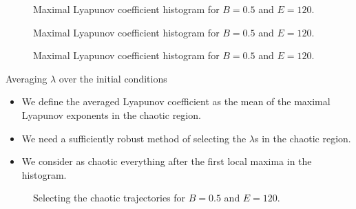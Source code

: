 \documentclass{beamer}
\begin{document}
\begin{frame}
	\begin{figure}
		
		\caption{Maximal Lyapunov coefficient histogram for \(B=0.5\)
		and \(E=120\).}
	\end{figure}
\end{frame}


\begin{frame}
	\begin{figure}
		
		\caption{Maximal Lyapunov coefficient histogram for \(B=0.5\)
		and \(E=120\).}
	\end{figure}
\end{frame}


\begin{frame}
	\begin{figure}
		
		\caption{Maximal Lyapunov coefficient histogram for \(B=0.5\)
		and \(E=120\).}
	\end{figure}
\end{frame}


\begin{frame}{Averaging \(\lambda\) over the initial conditions}
	\begin{itemize}
		\item We define the averaged Lyapunov coefficient as the
		mean of the maximal Lyapunov exponents in the chaotic region.
		\item We need a sufficiently robust method of selecting
		the \(\lambda\)s in the chaotic region.
		\item We consider as chaotic everything after the first
		local maxima in the histogram.
	\end{itemize}
\end{frame}


\begin{frame}
	\begin{figure}
		
		\caption{Selecting the chaotic trajectories for \(B=0.5\)
		and \(E=120\).}
	\end{figure}
\end{frame}
\end{document}
